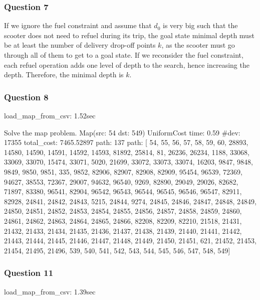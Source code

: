 \documentclass[11pt]{article}
\begin{document}
    \subsubsection{Question 7}\label{question-7}

If we ignore the fuel constraint and assume that \(d_0\) is very big
such that the scooter does not need to refuel during its trip, the goal
state minimal depth must be at least the number of delivery drop-off
points \(k\), as the scooter must go through all of them to get to a
goal state. If we reconsider the fuel constraint, each refuel operation
adds one level of depth to the search, hence increasing the depth.
Therefore, the minimal depth is \(k\).

    \subsubsection{Question 8}\label{question-8}

load\_map\_from\_csv: 1.52sec

Solve the map problem. Map(src: 54 dst: 549) UniformCost time: 0.59
\#dev: 17355 total\_cost: 7465.52897 \textbar{}path\textbar{}: 137 path:
{[} 54, 55, 56, 57, 58, 59, 60, 28893, 14580, 14590, 14591, 14592,
14593, 81892, 25814, 81, 26236, 26234, 1188, 33068, 33069, 33070, 15474,
33071, 5020, 21699, 33072, 33073, 33074, 16203, 9847, 9848, 9849, 9850,
9851, 335, 9852, 82906, 82907, 82908, 82909, 95454, 96539, 72369, 94627,
38553, 72367, 29007, 94632, 96540, 9269, 82890, 29049, 29026, 82682,
71897, 83380, 96541, 82904, 96542, 96543, 96544, 96545, 96546, 96547,
82911, 82928, 24841, 24842, 24843, 5215, 24844, 9274, 24845, 24846,
24847, 24848, 24849, 24850, 24851, 24852, 24853, 24854, 24855, 24856,
24857, 24858, 24859, 24860, 24861, 24862, 24863, 24864, 24865, 24866,
82208, 82209, 82210, 21518, 21431, 21432, 21433, 21434, 21435, 21436,
21437, 21438, 21439, 21440, 21441, 21442, 21443, 21444, 21445, 21446,
21447, 21448, 21449, 21450, 21451, 621, 21452, 21453, 21454, 21495,
21496, 539, 540, 541, 542, 543, 544, 545, 546, 547, 548, 549{]}

    \subsubsection{Question 11}\label{question-11}

load\_map\_from\_csv: 1.39sec
\end{document}
